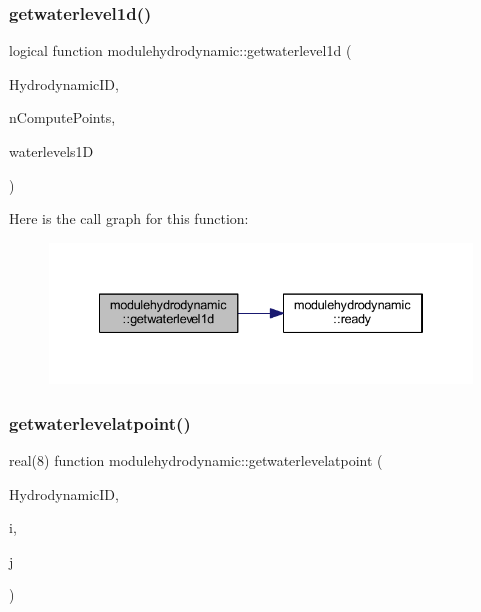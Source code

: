 \subsubsection{\texorpdfstring{getwaterlevel1d()}{getwaterlevel1d()}}
{\footnotesize\ttfamily logical function modulehydrodynamic\+::getwaterlevel1d (\begin{DoxyParamCaption}\item[{integer}]{Hydrodynamic\+ID,  }\item[{integer}]{n\+Compute\+Points,  }\item[{real(8), dimension(ncomputepoints)}]{waterlevels1D }\end{DoxyParamCaption})\hspace{0.3cm}{\ttfamily [private]}}

Here is the call graph for this function\+:\nopagebreak
\begin{figure}[H]
\begin{center}
\leavevmode
\includegraphics[width=334pt]{namespacemodulehydrodynamic_a904ffc2601f0d353ef41686c0912a17d_cgraph}
\end{center}
\end{figure}
\mbox{\label{namespacemodulehydrodynamic_aed5f042412115b2fc0605a45374090fc}} 
\subsubsection{\texorpdfstring{getwaterlevelatpoint()}{getwaterlevelatpoint()}}
{\footnotesize\ttfamily real(8) function modulehydrodynamic\+::getwaterlevelatpoint (\begin{DoxyParamCaption}\item[{integer}]{Hydrodynamic\+ID,  }\item[{integer}]{i,  }\item[{integer}]{j }\end{DoxyParamCaption})\hspace{0.3cm}{\ttfamily [private]}}

